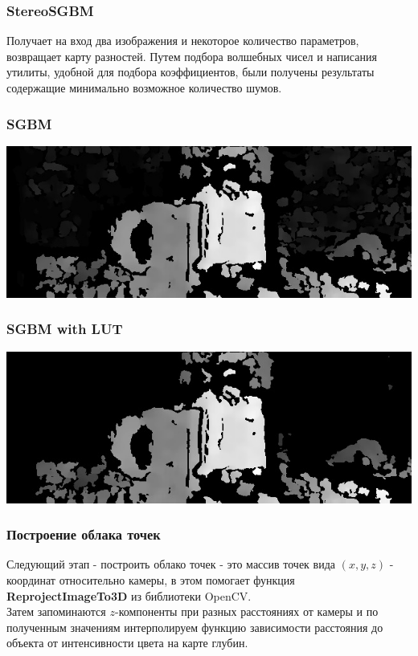 \documentclass{beamer}
\begin{document}
		\begin{frame}
			\frametitle{StereoSGBM}
			Получает на вход два изображения и некоторое количество параметров, возвращает карту разностей. Путем подбора волшебных чисел и написания утилиты, удобной для подбора коэффициентов, были получены результаты содержащие минимально возможное количество шумов.
		\end{frame}
		\begin{frame}
		    \frametitle{SGBM}
		   
		    \begin{center}
				\includegraphics[scale=0.7]{images/disp}
			\end{center}
		\end{frame}
		\begin{frame}
		    \frametitle{SGBM with LUT}
		   
		    \begin{center}
				\includegraphics[scale=0.7]{images/dispLUT}
			\end{center}
		\end{frame}
		\begin{frame}
			\frametitle{Построение облака точек}
			
			Следующий этап - построить облако точек - это массив
			точек вида $(x, y, z)$ - координат относительно камеры, в
			этом помогает функция \textbf{ReprojectImageTo3D} из библиотеки
			OpenCV.\\
			Затем запоминаются $z$-компоненты при разных расстояниях от камеры
			и по полученным значениям интерполируем функцию зависимости
			расстояния до объекта от интенсивности цвета на карте глубин.
			
		\end{frame}
		
\end{document}
